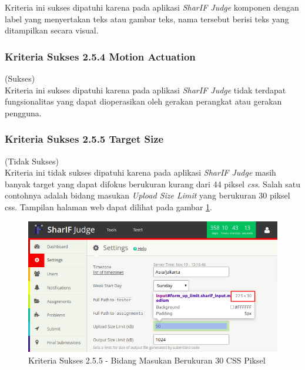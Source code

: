 \documentclass[a4paper,twoside]{article}
\begin{document}
\begin{enumerate}
		Kriteria ini sukses dipatuhi karena pada aplikasi \textit{SharIF Judge} komponen dengan label yang menyertakan teks atau gambar teks, nama tersebut berisi teks yang ditampilkan secara visual.
		
		\subsubsection*{Kriteria Sukses 2.5.4 Motion Actuation}
		\label{subsubsec:kepatuhan_kriteria_2.5.4}
		(Sukses) \\
		
		Kriteria ini sukses dipatuhi karena pada aplikasi \textit{SharIF Judge} tidak terdapat fungsionalitas yang dapat dioperasikan oleh gerakan perangkat atau gerakan pengguna.
		
		\subsubsection*{Kriteria Sukses 2.5.5 Target Size}
		\label{subsubsec:kepatuhan_kriteria_2.5.5}
		(Tidak Sukses) \\
		
		Kriteria ini tidak sukses dipatuhi karena pada aplikasi \textit{SharIF Judge} masih banyak target yang dapat difokus berukuran kurang dari 44 piksel \textit{css}. Salah satu contohnya adalah bidang masukan \textit{Upload Size Limit} yang berukuran 30 piksel css. Tampilan halaman web dapat dilihat pada gambar \ref{fig:kepatuhan_2_5_5}.
		
		\begin{figure}[H]
			\centering  
			\includegraphics[scale=0.5]{kepatuhan_2_5_5}  
			\caption[Kriteria Sukses 2.5.5 - Bidang Masukan Berukuran 30 CSS Piksel]{Kriteria Sukses 2.5.5 - Bidang Masukan Berukuran 30 CSS Piksel} 
			\label{fig:kepatuhan_2_5_5} 
		\end{figure}
		

\end{enumerate}
\end{document}
